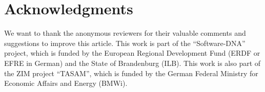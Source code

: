 \documentclass[smallextended,natbib]{svjour3}       %
\begin{document}
\section*{Acknowledgments}
We want to thank the anonymous reviewers for their valuable comments and suggestions to improve this article.
This work is part of the \enquote{Software-DNA} project, which is funded by the European Regional Development Fund (ERDF or EFRE in German) and the State of Brandenburg (ILB).
This work is also part of the ZIM project \enquote{TASAM}, which is funded by the German Federal Ministry for Economic Affairs and Energy (BMWi).



\end{document}
